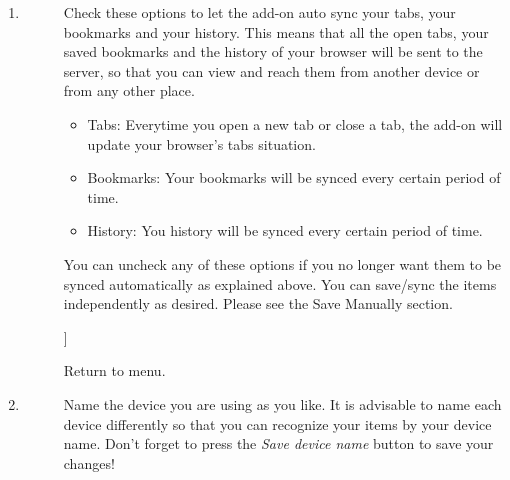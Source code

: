 \documentclass{article}
\begin{document}
\begin{description}
\begin{enumerate}
											\item  
											\begin{description}
											\item[\textbf{\paragraph*{Auto sync: Tabs \& Bookmarks \& History.}} 
												]
												\par Check these options to let the add-on auto sync your tabs, your bookmarks and your history. This means that all 
												the open tabs, your saved bookmarks and the history of your browser will be sent to the server, so that you can 
												view and reach them from another device or from any other place.  
												\begin{itemize}
													\item  Tabs: Everytime you open a new tab or close a tab, the add-on will update your browser's tabs situation.
													\item  Bookmarks: Your bookmarks will be synced every certain period of time. 
													\item  History: You history will be synced every certain period of time.  
												\end{itemize}
												\par You can uncheck any of these options if you no longer want them to be synced automatically as explained above.
												You can save/sync the items independently as desired. Please see the Save Manually
												section.
												
												]
													 
													Return to menu.
												
											\end{description}
											
											
										
										
											\item 
											\begin{description}
											\item[\textbf{ \emph{\paragraph*{ Name this device as }}}
												]
												\par Name the device you are using as you like. It is advisable to name each device differently so that you can
												recognize your items by your device name. Don't forget to press the \emph{ Save device name } button to save
												your changes!
												

\end{description}
\end{enumerate}
\end{description}
\end{document}
